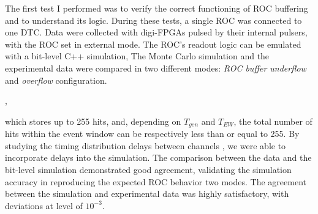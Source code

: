The first test I performed was to verify the 
correct functioning of 
ROC buffering and to understand its logic. 
During these tests, a single 
ROC was connected to one DTC. Data were 
collected with digi-FPGAs pulsed 
by their internal pulsers, with the ROC set 
in external mode. The ROC's  
readout logic can be emulated with a bit-level 
C++ simulation,
The Monte Carlo simulation 
and the experimental 
data were compared in two different modes: 
\textit{ROC buffer underflow} and \textit{overflow} 
configuration.

,


which stores up to 255 hits, 
and, depending on \( T_{gen} \) and \( T_{EW} \), 
the total number of hits within the event window 
can be respectively 
less than or equal to 255. 
By studying the timing distribution  delays 
between  channels , we 
were able to incorporate  delays into 
the simulation. The comparison 
between the data and the bit-level simulation 
demonstrated good agreement, 
validating the simulation accuracy in reproducing 
the expected ROC behavior   
 two  modes. The agreement between 
the simulation and  experimental data was highly satisfactory,
with  deviations at  level of \( 10^{-3} \).

